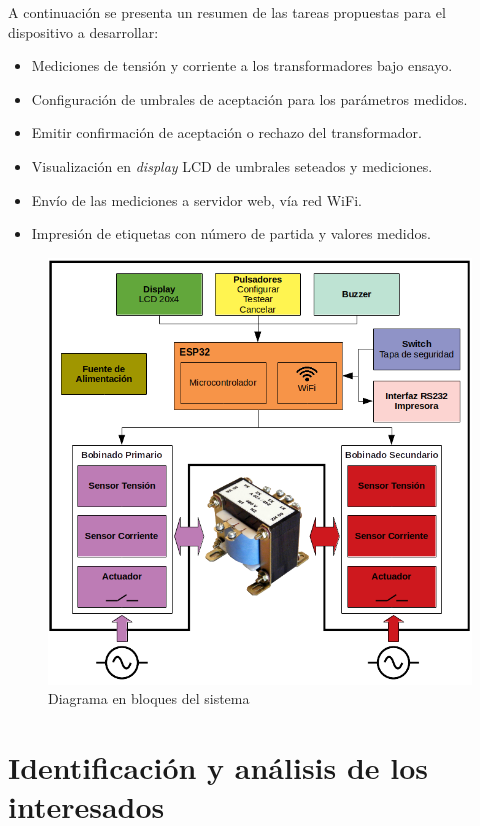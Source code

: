 \documentclass[11pt]{charter}
\begin{document}
A continuación se presenta un resumen de las tareas propuestas para el dispositivo a desarrollar:
\begin{itemize}
\item Mediciones de tensión y corriente a los transformadores bajo ensayo.
\item Configuración de umbrales de aceptación para los parámetros medidos.
\item Emitir confirmación de aceptación o rechazo del transformador.
\item Visualización en \textit{display} LCD de umbrales seteados y mediciones.
\item Envío de las mediciones a servidor web, vía red WiFi.
\item Impresión de etiquetas con número de partida y valores medidos. 
\end{itemize}

\begin{figure}[htpb]
\centering 
\includegraphics[width=.8\textwidth]{./Figuras/diagBloques.png}
\caption{Diagrama en bloques del sistema}
\label{fig:diagBloques}
\end{figure}

\section{Identificación y análisis de los interesados}
\label{sec:interesados}
\end{document}
